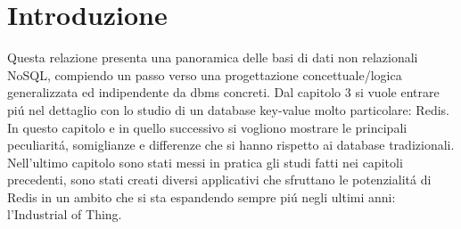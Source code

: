 \chapter*{Introduzione}
Questa relazione presenta una panoramica delle basi di dati non relazionali NoSQL, compiendo
un passo verso una progettazione concettuale/logica generalizzata ed indipendente da dbms concreti.
Dal capitolo 3 si vuole entrare piú nel dettaglio con lo studio di un database key-value molto particolare: Redis.
In questo capitolo e in quello successivo si vogliono mostrare le principali peculiaritá, somiglianze e differenze
che si hanno rispetto ai database tradizionali.
Nell'ultimo capitolo sono stati messi in pratica gli studi fatti nei capitoli precedenti, sono stati creati diversi
applicativi che sfruttano le potenzialitá di Redis in un ambito che si sta espandendo sempre piú negli
ultimi anni: l'Industrial of Thing.
